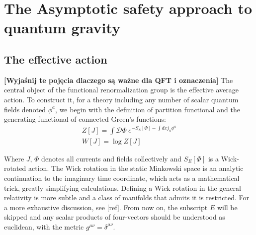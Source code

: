 \documentclass[11pt, a4paper]{article}
\newcommand{\jhkbf}[1]{\textbf{\color{red} [#1]}}
\begin{document}

\section{The Asymptotic safety approach to quantum gravity}
\subsection{The effective action}

\jhkbf{Wyjaśnij te pojęcia dlaczego są ważne dla QFT i oznaczenia}
The central object of the functional renormalization group is the effective average action. To construct it,
for a theory including any number of scalar quantum fields denoted $\phi^a$,
we begin with the definition of partition functional and the generating functional of connected Green's functions:
\begin{gather}
    Z[J] = \int \mathcal{D}\Phi \ e^{-S_E[\Phi] - \int dx j_a \phi^a} \\
    W[J] = \log{Z[J]}
\end{gather}

Where $J$, $\Phi$ denotes all currents and fields collectively and $S_E[\Phi]$ is a Wick-rotated action.
The Wick rotation in the static Minkowski space is an analytic continuation to the imaginary time coordinate, which acts as a mathematical trick, greatly simplifying calculations. Defining a Wick rotation in the general relativity is more subtle and a class of manifolds that admits it is restricted. For a more exhaustive discussion, see [ref].
From now on, the subscript $E$ will be skipped and any scalar products of four-vectors should be understood as euclidean, with the metric $g^{\mu\nu} = \delta^{\mu\nu}$.
\end{document}
